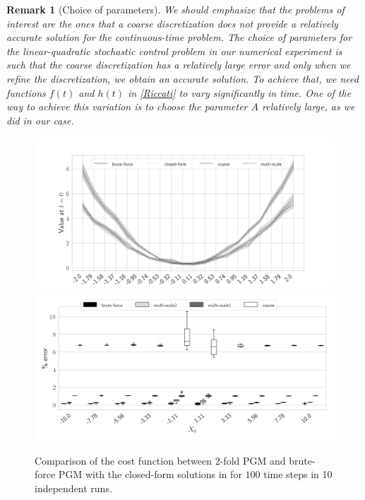 \documentclass{article}
\newtheorem{remark}{Remark}[section]
\numberwithin{equation}{section}
\begin{document}

\begin{remark}
    [Choice of parameters]
    We should emphasize that the problems of interest are the ones that a coarse discretization does not provide a relatively accurate solution for the continuous-time problem. The choice of parameters for the linear-quadratic stochastic control problem in our numerical experiment is such that the coarse discretization has a relatively large error and only when we refine the discretization, we obtain an accurate solution. To achieve that, we need functions $f(t)$ and $h(t)$ in \eqref{Riccati} to vary significantly in time. One of the way to achieve this variation is to choose the parameter $A$  relatively large, as we did in our case.
\end{remark}

\begin{figure}[ht!]
    \centering
    \includegraphics[width=1\linewidth]{figures/bf_100_50_7.png}
    \includegraphics[width=.9\linewidth]{figures/rel_100_50_5_Comparison_bf_ms2_coarse_7.png}
    \caption{Comparison of the cost function between $2$-fold PGM and brute-force PGM with the closed-form solutions in for $100$ time steps in 10 independent runs.}
    \label{fig:value0_comparison_bw_brute_multi}
\end{figure}
\end{document}
